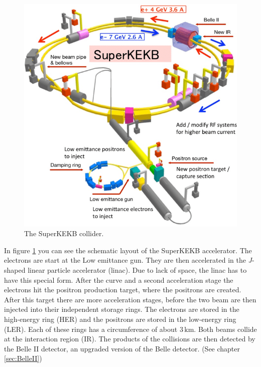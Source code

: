 \documentclass[a4paper,11pt,twosided,final,german,openbib,pdftex,listof=totoc,bibliography=totoc]{scrbook}
\begin{document}
\begin{figure}[h!]
\begin{center}
	\includegraphics[width=\textwidth]{Bilder/SuperKEKB.png}
	
	\caption[SuperKEKB Collider]{The SuperKEKB collider.\cite{SKEKAcc}}
	\label{fig:SuperKEKB}
\end{center}
\end{figure}






In figure \ref{fig:SuperKEKB} you can see the schematic layout of the SuperKEKB accelerator. The electrons are start at the Low emittance gun. They are then accelerated in the \textit{J}-shaped linear particle accelerator (linac). Due to lack of space, the linac has to have this special form.\cite{KEKBJArc} After the curve and a second acceleration stage the electrons hit the positron production target, where the positrons are created. After this target there are more acceleration stages, before the two beam are then injected into their independent storage rings. The electrons are stored in the high-energy ring (HER) and the positrons are stored in the low-energy ring (LER). Each of these rings has a circumference of about $3\,\textrm{km}$. Both beams collide at the interaction region (IR). The products of the collisions are then detected by the Belle II detector, an upgraded version of the Belle detector.\cite{B2B} (See chapter \ref{sec:BelleII})
\end{document}
